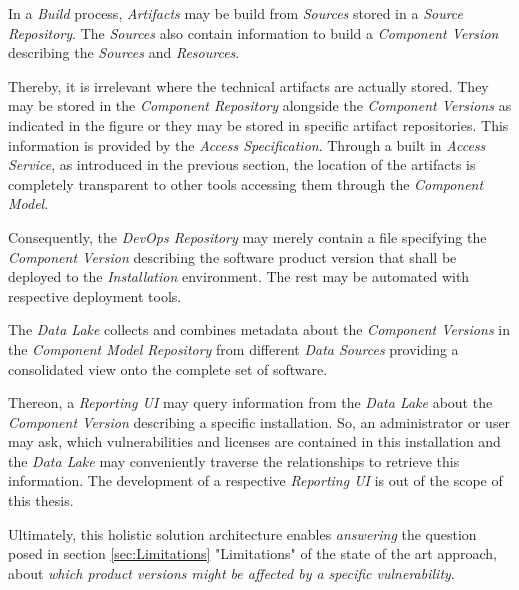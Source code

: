 In a \emph{Build} process, \emph{Artifacts} may be build from \emph{Sources} stored in a \emph{Source Repository}. The \emph{Sources} also contain information to build a \emph{Component Version} describing the \emph{Sources} and \emph{Resources}.\par
Thereby, it is irrelevant where the technical artifacts are actually stored. They may be stored in the \emph{Component Repository} alongside the \emph{Component Versions} as indicated in the figure or they may be stored in specific artifact repositories. This information is provided by the \emph{Access Specification}. Through a built in \emph{Access Service}, as introduced in the previous section, the location of the artifacts is completely transparent to other tools accessing them through the \emph{Component Model}.\par
Consequently, the \emph{DevOps Repository} may merely contain a file specifying the \emph{Component Version} describing the software product version that shall be deployed to the \emph{Installation} environment. The rest may be automated with respective deployment tools.\par
The \emph{Data Lake} collects and combines metadata about the \emph{Component Versions} in the \emph{Component Model Repository} from different \emph{Data Sources} providing a consolidated view onto the complete set of software.\par
Thereon, a \emph{Reporting UI} may query information from the \emph{Data Lake} about the \emph{Component Version} describing a specific installation. So, an administrator or user may ask, which vulnerabilities and licenses are contained in this installation and the \emph{Data Lake} may conveniently traverse the relationships to retrieve this information. The development of a respective \emph{Reporting UI} is out of the scope of this thesis.\par
Ultimately, this holistic solution architecture enables \emph{answering} the question posed in section \ref{sec:Limitations} "Limitations" of the state of the art approach, about \emph{which product versions might be affected by a specific vulnerability}.\par
